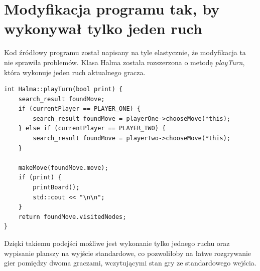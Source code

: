 \documentclass[a4paper, 12pt]{article}
\begin{document}
\section{Modyfikacja programu tak, by wykonywał tylko jeden ruch}
Kod źródłowy programu został napisany na tyle elastycznie,
że modyfikacja ta nie sprawiła problemów. 
Klasa Halma została rozszerzona o metodę \textit{playTurn}, która
wykonuje jeden ruch aktualnego gracza.
\begin{lstlisting}
int Halma::playTurn(bool print) {
    search_result foundMove;
    if (currentPlayer == PLAYER_ONE) {
        search_result foundMove = playerOne->chooseMove(*this);
    } else if (currentPlayer == PLAYER_TWO) {
        search_result foundMove = playerTwo->chooseMove(*this);
    }

    makeMove(foundMove.move);
    if (print) {
        printBoard();
        std::cout << "\n\n";
    }
    return foundMove.visitedNodes;
}
\end{lstlisting}
Dzięki takiemu podejści możliwe jest wykonanie tylko jednego ruchu oraz wypisanie 
planszy na wyjście standardowe, co pozwoliłoby na 
łatwe rozgrywanie gier pomiędzy dwoma graczami, wczytującymi stan gry ze standardowego 
wejścia.
\end{document}
